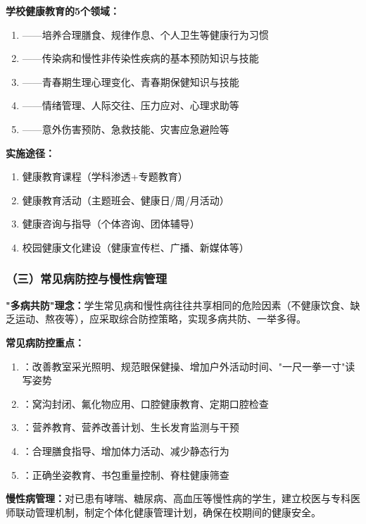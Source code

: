 \begin{keybox}
\textbf{学校健康教育的5个领域：}
\begin{enumerate}[leftmargin=*]
    \item {}——培养合理膳食、规律作息、个人卫生等健康行为习惯
    \item {}——传染病和慢性非传染性疾病的基本预防知识与技能
    \item {}——青春期生理心理变化、青春期保健知识与技能
    \item {}——情绪管理、人际交往、压力应对、心理求助等
    \item {}——意外伤害预防、急救技能、灾害应急避险等
\end{enumerate}

\textbf{实施途径：}
\begin{enumerate}[leftmargin=*]
    \item 健康教育课程（学科渗透+专题教育）
    \item 健康教育活动（主题班会、健康日/周/月活动）
    \item 健康咨询与指导（个体咨询、团体辅导）
    \item 校园健康文化建设（健康宣传栏、广播、新媒体等）
\end{enumerate}
\end{keybox}

\subsubsection{（三）常见病防控与慢性病管理}

\begin{keybox}
\textbf{"多病共防"理念：}学生常见病和慢性病往往共享相同的危险因素（不健康饮食、缺乏运动、熬夜等），应采取综合防控策略，实现多病共防、一举多得。

\textbf{常见病防控重点：}
\begin{enumerate}[leftmargin=*]
    \item {}：改善教室采光照明、规范眼保健操、增加户外活动时间、"一尺一拳一寸"读写姿势
    \item {}：窝沟封闭、氟化物应用、口腔健康教育、定期口腔检查
    \item {}：营养教育、营养改善计划、生长发育监测与干预
    \item {}：合理膳食指导、增加体力活动、减少静态行为
    \item {}：正确坐姿教育、书包重量控制、脊柱健康筛查
\end{enumerate}

\textbf{慢性病管理：}对已患有哮喘、糖尿病、高血压等慢性病的学生，建立校医与专科医师联动管理机制，制定个体化健康管理计划，确保在校期间的健康安全。
\end{keybox}

